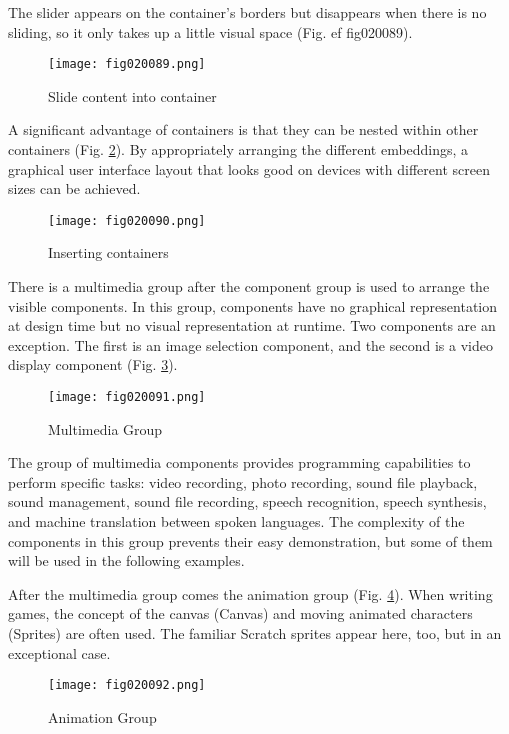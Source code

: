 The slider appears on the container's borders but disappears when there is no sliding, so it only takes up a little visual space (Fig. ef {fig020089}).

\begin{figure}[H]
   \centering
   \texttt{[image: fig020089.png]}
   \caption{Slide content into container}
\label{fig020089}
\end{figure}

A significant advantage of containers is that they can be nested within other containers (Fig. \ref{fig020090}). By appropriately arranging the different embeddings, a graphical user interface layout that looks good on devices with different screen sizes can be achieved.

\begin{figure}[H]
   \centering
   \texttt{[image: fig020090.png]}
   \caption{Inserting containers}
\label{fig020090}
\end{figure}

There is a multimedia group after the component group is used to arrange the visible components. In this group, components have no graphical representation at design time but no visual representation at runtime. Two components are an exception. The first is an image selection component, and the second is a video display component (Fig. \ref{fig020091}).

\begin{figure}[H]
   \centering
   \texttt{[image: fig020091.png]}
   \caption{Multimedia Group}
\label{fig020091}
\end{figure}

The group of multimedia components provides programming capabilities to perform specific tasks: video recording, photo recording, sound file playback, sound management, sound file recording, speech recognition, speech synthesis, and machine translation between spoken languages. The complexity of the components in this group prevents their easy demonstration, but some of them will be used in the following examples.

After the multimedia group comes the animation group (Fig. \ref{fig020092}). When writing games, the concept of the canvas (Canvas) and moving animated characters (Sprites) are often used. The familiar Scratch sprites appear here, too, but in an exceptional case.

\begin{figure}[H]
   \centering
   \texttt{[image: fig020092.png]}
   \caption{Animation Group}
\label{fig020092}
\end{figure}

